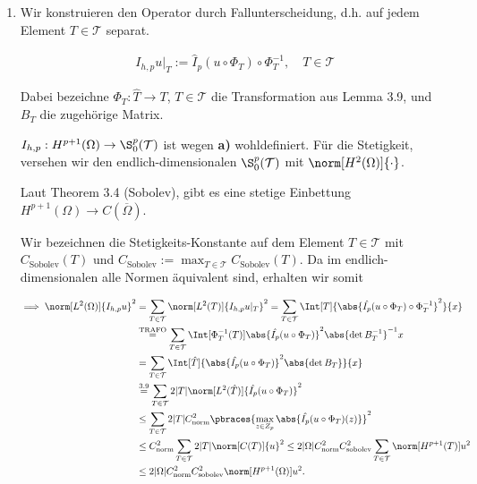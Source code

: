 \begin{solution}
\begin{enumerate}[label = \textbf{\alph*)}]
\begin{enumerate}[label = (\roman*)]
    \end{enumerate}

    \item Wir konstruieren den Operator durch Fallunterscheidung, d.h. auf jedem Element $T \in \mathcal{T}$ separat.

    \begin{align*}
      I_{h, p} u|_T := \hat I_p(u \circ \Phi_T) \circ \Phi_T^{-1},
      \quad
      T \in \mathcal{T}
    \end{align*}

    Dabei bezeichne $\Phi_T: \hat T \to T$, $T \in \mathcal{T}$ die Transformation aus Lemma 3.9, und $B_T$ die zugehörige Matrix.


    $I_{h, p}: H^{p+1}(\Omega) \to \S_0^p(\mathcal{T})$ ist wegen \textbf{a)} wohldefiniert.
    Für die Stetigkeit, versehen wir den endlich-dimensionalen $\S_0^p(\mathcal{T})$ mit $\norm[H^2(\Omega)]{\cdot}$.

    Laut Theorem 3.4 (Sobolev), gibt es eine stetige Einbettung $H^{p+1}(\Omega) \to C(\overline{\Omega})$.


    Wir bezeichnen die Stetigkeits-Konstante auf dem Element $T \in \mathcal{T}$ mit $C_\mathrm{Sobolev}(T)$ und $C_\mathrm{Sobolev} := \max_{T \in \mathcal{T}} C_\mathrm{Sobolev}(T)$.
    Da im endlich-dimensionalen alle Normen äquivalent sind, erhalten wir somit

    \begin{align*}
      \implies
      \norm[L^2(\Omega)]{I_{h, p} u}^2
      & =
      \sum_{T \in \mathcal{T}}
      \norm[L^2(T)]{I_{h, p} u|_T}^2
      =
      \sum_{T \in \mathcal{T}}
      \Int[T]{\abs{\hat{I_p}(u \circ \Phi_T) \circ \Phi_T^{-1}}^2}{x} \\
      & \stackrel
      {
        \mathrm{TRAFO}
      }{=}
      \sum_{T \in \mathcal{T}}
      \Int[\Phi_T^{-1}(T)]{\abs{\hat{I_p}(u \circ \Phi_T)}^2 \abs{\det B_T^{-1}}^{-1}}{x} \\
      & =
      \sum_{T \in \mathcal{T}}
      \Int[\hat T]{\abs{\hat{I_p}(u \circ \Phi_T)}^2 \abs{\det B_T}}{x} \\
      & \stackrel
      {
        \mathrm{3.9}
      }{=}
      \sum_{T \in \mathcal{T}}
      2 |T| \norm[L^2(\hat T)]{\hat{I_p}(u \circ \Phi_T)}^2 \\
      & \leq
      \sum_{T \in \mathcal{T}}
      2 |T| C_\mathrm{norm}^2
      \pbraces
      {
        \max_{z \in Z_p}
        \abs{\hat{I_p}(u \circ \Phi_T)(z)}
      }^2 \\
      & \leq
      C_\mathrm{norm}^2
      \sum_{T \in \mathcal{T}}
      2 |T| \norm[C(T)]{u}^2
      \leq
      2 |\Omega| C_\mathrm{norm}^2 C_\mathrm{sobolev}^2
      \sum_{T \in \mathcal{T}}
      \norm[H^{p+1}(T)]{u}^2 \\
      & \leq
      2 |\Omega| C_\mathrm{norm}^2 C_\mathrm{sobolev}^2 \norm[H^{p+1}(\Omega)]{u}^2.
    \end{align*}


\end{enumerate}
\end{solution}
